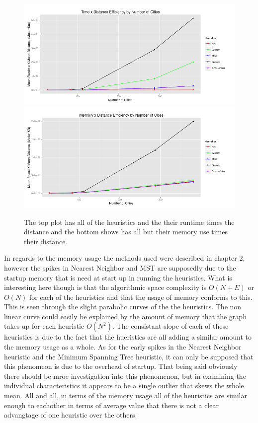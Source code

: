 \documentclass[midd]{thesis}
\newcommand{\tab}{\hspace*{2em}}
\begin{document}
\begin{figure}[h!]
	\begin{center}
	\caption{The top plot has all of the heuristics and the their runtime times the distance and the bottom shows has all but their memory use times their distance.}
	\includegraphics[width=.95\textwidth]{timexdistance_numcities}
	\includegraphics[width=.95\textwidth]{memxdistance_numcities}
	\end{center}
\end{figure}
\tab In regards to the memory usage the methods used were described in chapter 2, however the spikes in Nearest Neighbor and MST are supposedly due to the startup memory that is need at start up in running the heuristics. What is interesting here though is that the algorithmic space complexity is $O(N+E)$ or $O(N)$ for each of the heuristics and that the usage of memory conforms to this. This is seen through the slight parabolic curves of the the heuristics. The non linear curve could easily be explained by the amount of memory that the graph takes up for each heuristic $O(N^2)$. The consistant slope of each of these heuristics is due to the fact that the hueristics are all adding a similar amount to the memory usage as a whole. As for the early spikes in the Nearest Neighbor heuristic and the Minimum Spanning Tree heuristic, it can only be supposed that this phenomeon is due to the overhead of startup. That being said obviously there should be mroe investigation into this phenomenon, but in examining the individual characteristics it appears to be a single outlier that skews the whole mean. All and all, in terms of the memory usage all of the heuristics are similar enough to eachother in terms of average value that there is not a clear advangtage of one heuristic over the others.\\
\end{document}
